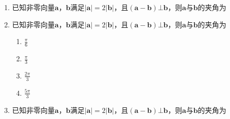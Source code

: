 \documentclass[12pt,a4paper]{exam}
\begin{document}
\begin{questions}
\begin{enumerate}
\item 已知非零向量$\mathbf{a}$，$\mathbf{b}$满足$|\mathbf{a}| = 2|\mathbf{b} |$，且$(\mathbf{a}-\mathbf{b}) \bot \mathbf{b}$，则$\mathbf{a}$与$\mathbf{b}$的夹角为


\item 已知非零向量$\mathbf{a}$，$\mathbf{b}$满足$|\mathbf{a}| = 2|\mathbf{b} |$，且$(\mathbf{a}-\mathbf{b}) \bot \mathbf{b}$，则$\mathbf{a}$与$\mathbf{b}$的夹角为
\begin{enumerate}
\item $\frac{\pi}{6} $
\item $\frac{\pi}{3} $
\item $\frac{2\pi}{3} $
\item $\frac{5\pi}{3} $
\end{enumerate}

\item 已知非零向量$\mathbf{a}$，$\mathbf{b}$满足$|\mathbf{a}| = 2|\mathbf{b} |$，且$(\mathbf{a}-\mathbf{b}) \bot \mathbf{b}$，则$\mathbf{a}$与$\mathbf{b}$的夹角为


\end{enumerate}

\end{questions} 
\end{document}

